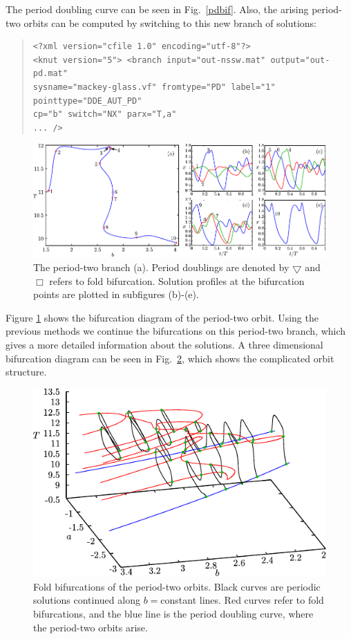 \documentclass[10pt,a4paper]{ddedoc}
\begin{document}
The period doubling curve can be seen in Fig.\ \ref{pdbif}.
Also, the arising period-two orbits can be computed by switching to this new
branch of solutions:
{ \small \begin{quote} \begin{lstlisting}[basicstyle=\tt,frame=single]
<?xml version="cfile 1.0" encoding="utf-8"?>
<knut version="5"> <branch input="out-nssw.mat" output="out-pd.mat"
sysname="mackey-glass.vf" fromtype="PD" label="1" pointtype="DDE_AUT_PD"
cp="b" switch="NX" parx="T,a"
... />
\end{lstlisting} \end{quote} } \noindent
%
\begin{figure}[t!]
\begin{center}
\includegraphics{fig/plot-pdsw}
\end{center}
\caption{The period-two branch (a). Period doublings are denoted by $\bigtriangledown$ and
$\Box$ refers to fold bifurcation. Solution profiles at the bifurcation points are plotted in subfigures (b)-(e).}
\label{pdsw}
\end{figure}
Figure \ref{pdsw} shows the bifurcation diagram of the period-two orbit. Using the
previous methods we continue the bifurcations on this period-two branch, which
gives a more detailed information about the solutions. A three dimensional
bifurcation diagram can be seen in Fig.\ \ref{pdfold}, which shows the
complicated orbit structure.
\begin{figure}[t!]
\begin{center}
\includegraphics{fig/plot-lp3d}
\end{center}
\caption{Fold bifurcations of the period-two orbits. Black curves are periodic
solutions continued along $b=$constant lines. Red curves refer to fold
bifurcations, and the blue line is the period doubling curve, where the
period-two orbits arise. }
\label{pdfold}
\end{figure}
\end{document}
